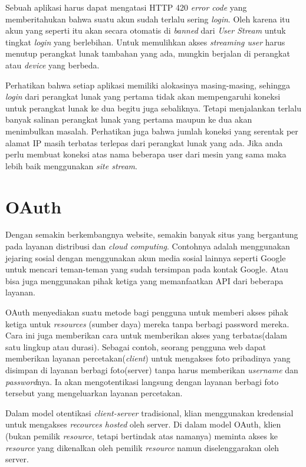 Sebuah aplikasi harus dapat mengatasi HTTP 420 \textit{error code} yang memberitahukan bahwa suatu akun sudah terlalu sering \textit{login}. Oleh karena itu akun yang seperti itu akan secara otomatis di \textit{banned} dari \textit{User Stream} untuk tingkat \textit{login} yang berlebihan. Untuk memulihkan akses \textit{streaming user} harus menutup perangkat lunak tambahan yang ada, mungkin berjalan di perangkat atau \textit{device} yang berbeda.

Perhatikan bahwa setiap aplikasi memiliki alokasinya masing-masing, sehingga \textit{login} dari perangkat lunak yang pertama tidak akan mempengaruhi koneksi untuk perangkat lunak ke dua begitu juga sebaliknya. Tetapi menjalankan terlalu banyak salinan perangkat lunak yang pertama maupun ke dua akan menimbulkan masalah. Perhatikan juga bahwa jumlah koneksi yang serentak per alamat IP masih terbatas terlepas dari perangkat lunak yang ada. Jika anda perlu membuat koneksi atas nama beberapa user dari mesin yang sama maka lebih baik menggunakan \textit{site stream}.

\section{OAuth}
\label{sec:oauth}
Dengan semakin berkembangnya website, semakin banyak situs yang bergantung pada layanan distribusi dan \textit{cloud computing}. Contohnya adalah menggunakan jejaring sosial dengan menggunakan akun media sosial lainnya seperti Google untuk mencari teman-teman yang sudah tersimpan pada kontak Google. Atau bisa juga menggunakan pihak ketiga yang memanfaatkan API dari beberapa layanan.

OAuth menyediakan suatu metode bagi pengguna untuk memberi akses pihak ketiga untuk \textit{resources} (sumber daya) mereka tanpa berbagi password mereka. Cara ini juga memberikan cara untuk memberikan akses yang terbatas(dalam satu lingkup atau durasi). Sebagai contoh, seorang pengguna web dapat memberikan layanan percetakan(\textit{client}) untuk mengakses foto pribadinya yang disimpan di layanan berbagi foto(server) tanpa harus memberikan \textit{username} dan \textit{password}nya. Ia akan mengotentikasi langsung dengan layanan berbagi foto tersebut yang mengeluarkan layanan percetakan.

Dalam model otentikasi \textit{client-server} tradisional, klian menggunakan kredensial untuk mengakses \textit{recources hosted} oleh server. Di dalam model OAuth, klien (bukan pemilik \textit{resource}, tetapi bertindak atas namanya) meminta akses ke \textit{resource} yang dikenalkan oleh pemilik \textit{resource} namun diselenggarakan oleh server.

